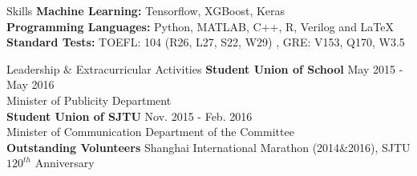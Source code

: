 \documentclass{resume} %
\begin{document}
\begin{rSection}{Skills}
{\bf Machine Learning: }
\hspace*{3.0 cm} Tensorflow, XGBoost, Keras\\
{\bf Programming Languages: }
\hspace*{1.8 cm} Python, MATLAB, C++, R, Verilog and \LaTeX  \\
{\bf Standard Tests: }
\hspace*{3.53 cm} TOEFL: 104 (R26, L27, S22, W29) , GRE: V153, Q170, W3.5
\end{rSection}

\begin{rSection}{Leadership $\&$ Extracurricular Activities}
\textbf{Student Union of School} \hfill{May 2015 - May 2016}\\
Minister of Publicity Department  \\
\textbf{Student Union of SJTU} \hfill{Nov. 2015 - Feb. 2016}\\
Minister of Communication Department of the Committee \\
\textbf{Outstanding Volunteers} \hfill{Shanghai International Marathon (2014$\&$2016), SJTU $120^{th}$ Anniversary}
\end{rSection}
\clearpage
\end{document}
